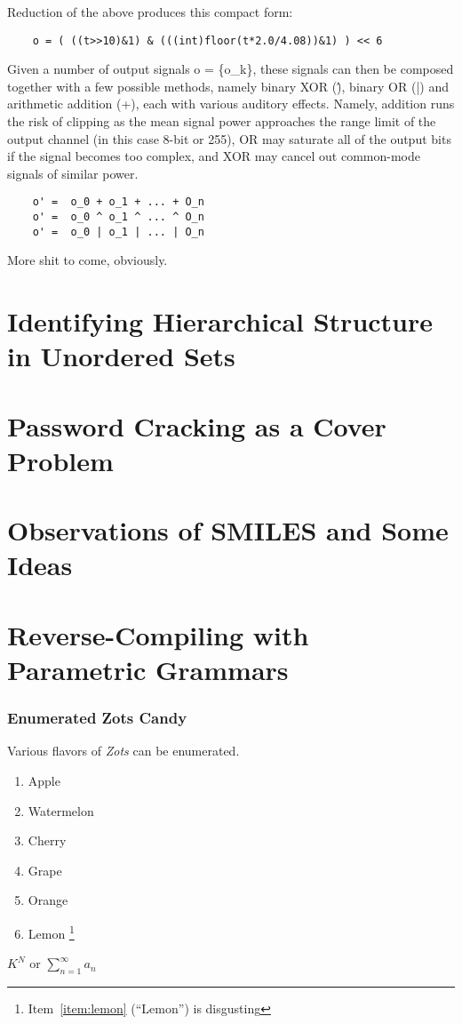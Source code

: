 \documentclass[11pt]{book}
\begin{document}
Reduction of the above produces this compact form:

\begin{verbatim}
	o = ( ((t>>10)&1) & (((int)floor(t*2.0/4.08))&1) ) << 6
\end{verbatim}

Given a number of output signals o = \{o\_k\}, these signals can then be composed together with a few possible
methods, namely binary XOR (\^), binary OR (|) and arithmetic addition (+), each with various auditory effects.
Namely, addition runs the risk of clipping as the mean signal power approaches the range limit of the output
channel (in this case 8-bit or 255), OR may saturate all of the output bits if the signal becomes too complex,
and XOR may cancel out common-mode signals of similar power.

\begin{verbatim}
	o' =  o_0 + o_1 + ... + O_n
	o' =  o_0 ^ o_1 ^ ... ^ O_n
	o' =  o_0 | o_1 | ... | O_n
\end{verbatim}

More shit to come, obviously.

\chapter{Identifying Hierarchical Structure in Unordered Sets}
\chapter{Password Cracking as a Cover Problem}
\chapter{Observations of SMILES and Some Ideas}
\chapter{Reverse-Compiling with Parametric Grammars}

\subsection{Enumerated Zots Candy}

Various flavors of \emph{Zots} can be enumerated.

\begin{enumerate}
	\item Apple
	\item Watermelon
	\item Cherry
	\item Grape
	\item Orange
	\item \label{item:lemon} Lemon%
\footnote{Item~\ref{item:lemon} (``Lemon'') is disgusting}
\end{enumerate}

$K^N$ or $\displaystyle\sum^{\infty}_{n=1} a_n$
\end{document}
